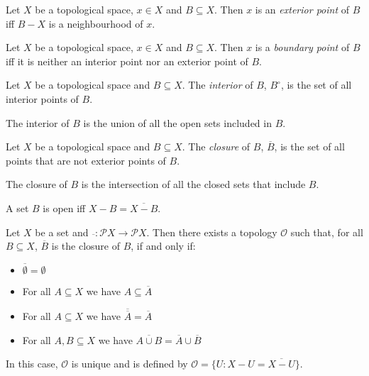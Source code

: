 \begin{df}
Let $X$ be a topological space, $x \in X$ and $B \subseteq X$. Then $x$ is an \emph{exterior point} of $B$ iff $B - X$ is a neighbourhood of $x$.
\end{df}

\begin{df}
Let $X$ be a topological space, $x \in X$ and $B \subseteq X$. Then $x$ is a \emph{boundary point} of $B$ iff it is neither an interior point nor an exterior point of $B$.
\end{df}

\begin{df}[Interior]
Let $X$ be a topological space and $B \subseteq X$. The \emph{interior} of $B$, $B^\circ$, is the set of all interior points of $B$.
\end{df}

\begin{prop}
The interior of $B$ is the union of all the open sets included in $B$.
\end{prop}

\begin{df}[Closure]
Let $X$ be a topological space and $B \subseteq X$. The \emph{closure} of $B$, $\overline{B}$, is the set of all points that are not exterior points of $B$.
\end{df}

\begin{prop}
The closure of $B$ is the intersection of all the closed sets that include $B$.
\end{prop}

\begin{prop}
A set $B$ is open iff $X - B = \overline{X - B}$.
\end{prop}

\begin{prop}
Let $X$ be a set and $\overline{\ } : \mathcal{P} X \rightarrow \mathcal{P} X$. Then there exists a topology $\mathcal{O}$ such that, for all $B \subseteq X$, $\overline{B}$ is the closure of $B$, if and only if:
\begin{itemize}
\item $\overline{\emptyset} = \emptyset$
\item For all $A \subseteq X$ we have $A \subseteq \overline{A}$
\item For all $A \subseteq X$ we have $\overline{\overline{A}} = \overline{A}$
\item For all $A, B \subseteq X$ we have $\overline{A \cup B} = \overline{A} \cup \overline{B}$
\end{itemize}
In this case, $\mathcal{O}$ is unique and is defined by $\mathcal{O} = \{ U : X - U = \overline{X - U} \}$.
\end{prop}

